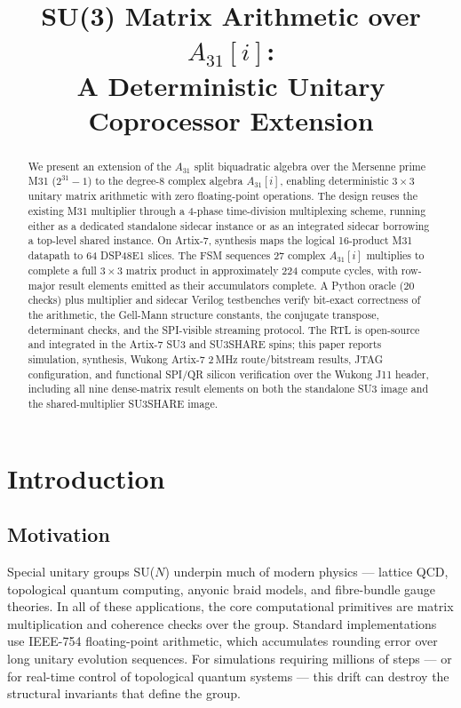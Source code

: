 \documentclass[conference]{IEEEtran}
\title{SU(3) Matrix Arithmetic over $A_{31}[i]$: \\
       A Deterministic Unitary Coprocessor Extension}
\author{
\IEEEauthorblockN{John Curley}
\IEEEauthorblockA{Independent Researcher, SPU-13 Project\\
github.com/pinnacletechnologysolutionsltd/SPU\\
\href{mailto:johncurley@pinnacletechglobal.com}{johncurley@pinnacletechglobal.com}}
}
\begin{document}
\maketitle

\begin{abstract}
We present an extension of the $A_{31}$ split biquadratic algebra over the
Mersenne prime M31 ($2^{31}-1$) to the degree-8 complex algebra $A_{31}[i]$,
enabling deterministic $3\times3$ unitary matrix arithmetic with zero
floating-point operations. The design reuses the existing M31 multiplier
through a 4-phase time-division multiplexing scheme, running either as a
dedicated standalone sidecar instance or as an integrated sidecar borrowing
a top-level shared instance. On Artix-7, synthesis maps the logical
16-product M31 datapath to 64 DSP48E1 slices. The FSM sequences 27 complex
$A_{31}[i]$ multiplies to complete a full $3\times3$ matrix product in
approximately 224 compute cycles, with row-major result elements emitted as
their accumulators complete. A Python oracle (20 checks) plus multiplier and
sidecar Verilog testbenches verify bit-exact correctness of the arithmetic,
the Gell-Mann structure constants, the conjugate transpose, determinant
checks, and the SPI-visible streaming protocol. The RTL is open-source and
integrated in the Artix-7 SU3 and SU3SHARE spins; this paper reports
simulation, synthesis, Wukong Artix-7 2\,MHz route/bitstream results, JTAG
configuration, and functional SPI/QR silicon verification over the Wukong
J11 header, including all nine dense-matrix result elements on both the
standalone SU3 image and the shared-multiplier SU3SHARE image.
\end{abstract}

\section{Introduction}

\subsection{Motivation}

Special unitary groups SU($N$) underpin much of modern physics --- lattice
QCD, topological quantum computing, anyonic braid models, and fibre-bundle
gauge theories. In all of these applications, the core computational
primitives are matrix multiplication and coherence checks over the group.
Standard implementations use IEEE-754 floating-point arithmetic, which
accumulates rounding error over long unitary evolution sequences. For
simulations requiring millions of steps --- or for real-time control of
topological quantum systems --- this drift can destroy the structural
invariants that define the group.
\end{document}
